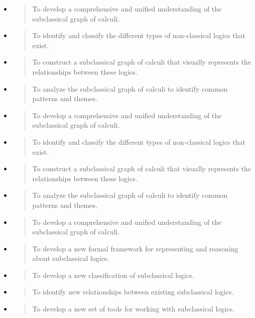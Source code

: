 \begin{itemize}
\begin{quote}
  \end{quote}
\item
  \begin{quote}
  To develop a comprehensive and unified understanding of the
  subclassical graph of calculi.
  \end{quote}
\item
  \begin{quote}
  To identify and classify the different types of non-classical logics
  that exist.
  \end{quote}
\item
  \begin{quote}
  To construct a subclassical graph of calculi that visually represents
  the relationships between these logics.
  \end{quote}
\item
  \begin{quote}
  To analyze the subclassical graph of calculi to identify common
  patterns and themes.
  \end{quote}
\item
  \begin{quote}
  To develop a comprehensive and unified understanding of the
  subclassical graph of calculi.
  \end{quote}
\item
  \begin{quote}
  To identify and classify the different types of non-classical logics
  that exist.
  \end{quote}
\item
  \begin{quote}
  To construct a subclassical graph of calculi that visually represents
  the relationships between these logics.
  \end{quote}
\item
  \begin{quote}
  To analyze the subclassical graph of calculi to identify common
  patterns and themes.
  \end{quote}
\item
  \begin{quote}
  To develop a comprehensive and unified understanding of the
  subclassical graph of calculi.
  \end{quote}
\item
  \begin{quote}
  To develop a new formal framework for representing and reasoning about
  subclassical logics.
  \end{quote}
\item
  \begin{quote}
  To develop a new classification of subclassical logics.
  \end{quote}
\item
  \begin{quote}
  To identify new relationships between existing subclassical logics.
  \end{quote}
\item
  \begin{quote}
  To develop a new set of tools for working with subclassical logics.
  \end{quote}
\end{itemize}


